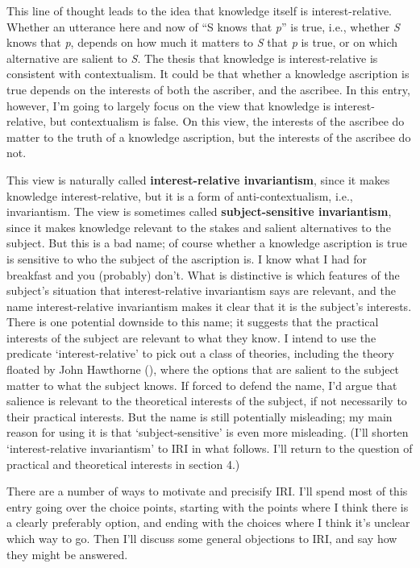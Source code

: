 \documentclass[
  11pt,
  letterpaper,
  DIV=11,
  numbers=noendperiod,
  twoside]{scrartcl}
\begin{document}
This line of thought leads to the idea that knowledge itself is
interest-relative. Whether an utterance here and now of ``S knows that
\emph{p}'' is true, i.e., whether \emph{S} knows that \emph{p}, depends
on how much it matters to \emph{S} that \emph{p} is true, or on which
alternative are salient to \emph{S}. The thesis that knowledge is
interest-relative is consistent with contextualism. It could be that
whether a knowledge ascription is true depends on the interests of both
the ascriber, and the ascribee. In this entry, however, I'm going to
largely focus on the view that knowledge is interest-relative, but
contextualism is false. On this view, the interests of the ascribee do
matter to the truth of a knowledge ascription, but the interests of the
ascribee do not.

This view is naturally called \textbf{interest-relative invariantism},
since it makes knowledge interest-relative, but it is a form of
anti-contextualism, i.e., invariantism. The view is sometimes called
\textbf{subject-sensitive invariantism}, since it makes knowledge
relevant to the stakes and salient alternatives to the subject. But this
is a bad name; of course whether a knowledge ascription is true is
sensitive to who the subject of the ascription is. I know what I had for
breakfast and you (probably) don't. What is distinctive is which
features of the subject's situation that interest-relative invariantism
says are relevant, and the name interest-relative invariantism makes it
clear that it is the subject's interests. There is one potential
downside to this name; it suggests that the practical interests of the
subject are relevant to what they know. I intend to use the predicate
`interest-relative' to pick out a class of theories, including the
theory floated by John Hawthorne (),
where the options that are salient to the subject matter to what the
subject knows. If forced to defend the name, I'd argue that salience is
relevant to the theoretical interests of the subject, if not necessarily
to their practical interests. But the name is still potentially
misleading; my main reason for using it is that `subject-sensitive' is
even more misleading. (I'll shorten `interest-relative invariantism' to
IRI in what follows. I'll return to the question of practical and
theoretical interests in section 4.)

There are a number of ways to motivate and precisify IRI. I'll spend
most of this entry going over the choice points, starting with the
points where I think there is a clearly preferably option, and ending
with the choices where I think it's unclear which way to go. Then I'll
discuss some general objections to IRI, and say how they might be
answered.
\end{document}
